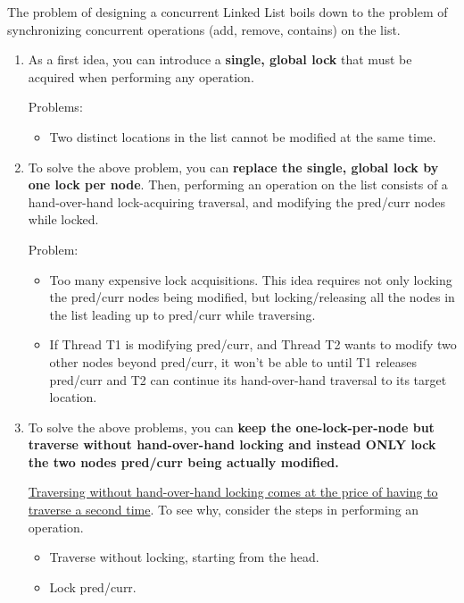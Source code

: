 The problem of designing a concurrent Linked List boils down to the problem of synchronizing concurrent operations (add, remove, contains) on the list.
\begin{enumerate}
    \item As a first idea, you can introduce a \textbf{single, global lock} that must be acquired when performing any operation.

    Problems:
    \begin{itemize}
        \item Two distinct locations in the list cannot be modified at the same time.
    \end{itemize}

    \item To solve the above problem, you can \textbf{replace the single, global lock by one lock per node}. Then, performing an operation on the list consists of a hand-over-hand lock-acquiring traversal, and modifying the pred/curr nodes while locked.

    Problem:
    \begin{itemize}
        \item Too many expensive lock acquisitions. This idea requires not only locking the pred/curr nodes being modified, but locking/releasing all the nodes in the list leading up to pred/curr while traversing.
        \item If Thread T1 is modifying pred/curr, and Thread T2 wants to modify two other nodes beyond pred/curr, it won't be able to until T1 releases pred/curr and T2 can continue its hand-over-hand traversal to its target location.
    \end{itemize}

    \item To solve the above problems, you can \textbf{keep the one-lock-per-node but traverse without hand-over-hand locking and instead ONLY lock the two nodes pred/curr being actually modified.}

    \underline{Traversing without hand-over-hand locking comes at the price of having to traverse a second time}. To see why, consider the steps in performing an operation.
    \begin{itemize}
        \item Traverse without locking, starting from the head.
        \item Lock pred/curr.
        

\end{itemize}
\end{enumerate}

